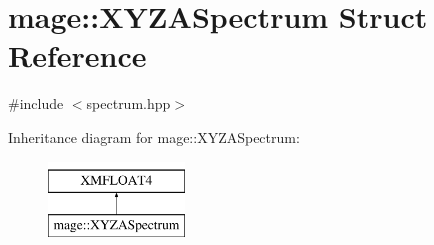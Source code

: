 \hypertarget{structmage_1_1_x_y_z_a_spectrum}{}\section{mage\+:\+:X\+Y\+Z\+A\+Spectrum Struct Reference}
\label{structmage_1_1_x_y_z_a_spectrum}


{\ttfamily \#include $<$spectrum.\+hpp$>$}

Inheritance diagram for mage\+:\+:X\+Y\+Z\+A\+Spectrum\+:\begin{figure}[H]
\begin{center}
\leavevmode
\includegraphics[height=2.000000cm]{structmage_1_1_x_y_z_a_spectrum}
\end{center}
\end{figure}
